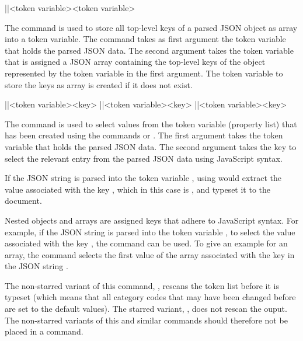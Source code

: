 \documentclass[a4paper]{article}
\begin{document}
{{\begin{macrodef}
|\JSONParseKeys|{<token variable>}{<token variable>}
\end{macrodef}
The command \macro{\JSONParseKeys} is used to store all top-level keys of a parsed JSON object as array into a token variable. The command takes as first argument the token variable that holds the parsed JSON data. The second argument takes the token variable that is assigned a JSON array containing the top-level keys of the object represented by the token variable in the first argument. The token variable to store the keys as array is created if it does not exist.

\begin{macrodef}
|\JSONParseValue|{<token variable>}{<key>}
|\JSONParseValue*|{<token variable>}{<key>}
|\JSONParseExpandableValue|{<token variable>}{<key>}
\end{macrodef}
The command \macro{\JSONParseValue} is used to select values from the token variable (property list) that has been created using the commands \macro{\JSONParse} or \macro{\JSONParseFromFile}. The first argument takes the token variable that holds the parsed JSON data. The second argument takes the key to select the relevant entry from the parsed JSON data using JavaScript syntax.

If the JSON string  is parsed into the token variable \macro{\myJSONdata}, using  would extract the value associated with the key , which in this case is , and typeset it to the document.

Nested objects and arrays are assigned keys that adhere to JavaScript syntax. For example, if the JSON string  is parsed into the token variable \macro{\myJSONdata}, to select the value associated with the key , the command  can be used. To give an example for an array, the command  selects the first value of the array associated with the key  in the JSON string .

The non-starred variant of this command, \macro{\JSONParseValue}, rescans the token list before it is typeset (which means that all category codes that may have been changed before are set to the default values). The starred variant, \macro{\JSONParseValue*}, does not rescan the ouput. The non-starred variants of this and similar commands should therefore not be placed in a \macro{\JSONParse} command. 

}}
\end{document}
